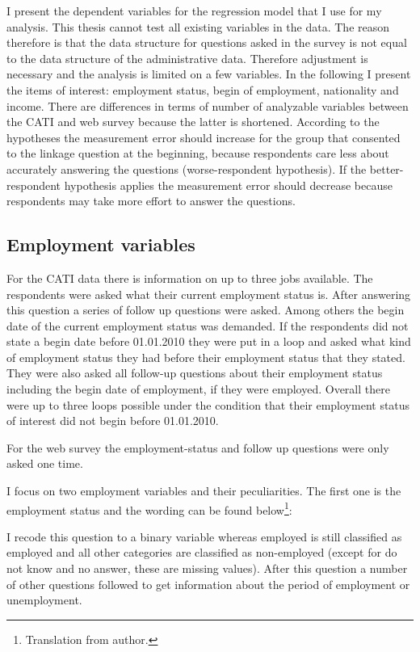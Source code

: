 I present the dependent variables for the regression model that I use for my analysis. This thesis cannot test all existing variables in the data. The reason therefore is that the data structure for questions asked in the survey is not equal to the data structure of the administrative data. Therefore adjustment is necessary and the analysis is limited on a few variables. In the following I present the items of interest: employment status, begin of employment, nationality and income. There are differences in terms of number of analyzable variables between the CATI and web survey because the latter is shortened. According to the hypotheses the measurement error should increase for the group that consented to the linkage question at the beginning, because respondents care less about accurately answering the questions (worse-respondent hypothesis). If the better-respondent hypothesis applies the measurement error should decrease because respondents may take more effort to answer the questions.    

\subsection{Employment variables}

For the CATI data there is information on up to three jobs available. The respondents were asked what their current employment status is. After answering this question a series of follow up questions were asked. Among others the begin date of the current employment status was demanded. If the respondents did not state a begin date before 01.01.2010 they were put in a loop and asked what kind of employment status they had before their employment status that they stated. They were also asked all follow-up questions about their employment status including the begin date of employment, if they were employed. Overall there were up to three loops possible under the condition that their employment status of interest did not begin before 01.01.2010. 

For the web survey the employment-status and follow up questions were only asked one time.
  
I focus on two employment variables and their peculiarities. The first one is the employment status and the wording can be found below\footnote{Translation from author.}:

I recode this question to a binary variable whereas employed is still classified as employed and all other categories are classified as non-employed (except for do not know and no answer, these are missing values). After this question a number of other questions followed to get information about the period of employment or unemployment. 

